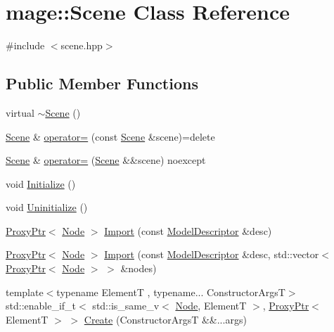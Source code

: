 \hypertarget{classmage_1_1_scene}{}\section{mage\+:\+:Scene Class Reference}
\label{classmage_1_1_scene}


{\ttfamily \#include $<$scene.\+hpp$>$}

\subsection*{Public Member Functions}
\begin{DoxyCompactItemize}
\item 
virtual \hyperlink{classmage_1_1_scene_adc40910fdca62586659c2961fe7e7f3c}{$\sim$\+Scene} ()
\item 
\hyperlink{classmage_1_1_scene}{Scene} \& \hyperlink{classmage_1_1_scene_a2c25c0fedc0230771d8c00a8288a69ce}{operator=} (const \hyperlink{classmage_1_1_scene}{Scene} \&scene)=delete
\item 
\hyperlink{classmage_1_1_scene}{Scene} \& \hyperlink{classmage_1_1_scene_a0256a5b54db093088f40511cf61eb277}{operator=} (\hyperlink{classmage_1_1_scene}{Scene} \&\&scene) noexcept
\item 
void \hyperlink{classmage_1_1_scene_a3cd12ef381ca743bf0b8f8aa2a76eb57}{Initialize} ()
\item 
void \hyperlink{classmage_1_1_scene_a714dc33c04dc2b8e2cec93564905b174}{Uninitialize} ()
\item 
\hyperlink{classmage_1_1_proxy_ptr}{Proxy\+Ptr}$<$ \hyperlink{classmage_1_1_node}{Node} $>$ \hyperlink{classmage_1_1_scene_a4e503b8a952ec95ebd844ffde0b26e9f}{Import} (const \hyperlink{classmage_1_1_model_descriptor}{Model\+Descriptor} \&desc)
\item 
\hyperlink{classmage_1_1_proxy_ptr}{Proxy\+Ptr}$<$ \hyperlink{classmage_1_1_node}{Node} $>$ \hyperlink{classmage_1_1_scene_ac7b2c61b6f46696905ddaf4251a13fdd}{Import} (const \hyperlink{classmage_1_1_model_descriptor}{Model\+Descriptor} \&desc, std\+::vector$<$ \hyperlink{classmage_1_1_proxy_ptr}{Proxy\+Ptr}$<$ \hyperlink{classmage_1_1_node}{Node} $>$ $>$ \&nodes)
\item 
{\footnotesize template$<$typename ElementT , typename... Constructor\+ArgsT$>$ }\\std\+::enable\+\_\+if\+\_\+t$<$ std\+::is\+\_\+same\+\_\+v$<$ \hyperlink{classmage_1_1_node}{Node}, ElementT $>$, \hyperlink{classmage_1_1_proxy_ptr}{Proxy\+Ptr}$<$ ElementT $>$ $>$ \hyperlink{classmage_1_1_scene_ac936ab1a1795a263455e5a9c420e2928}{Create} (Constructor\+ArgsT \&\&...args)

\end{DoxyCompactItemize}
